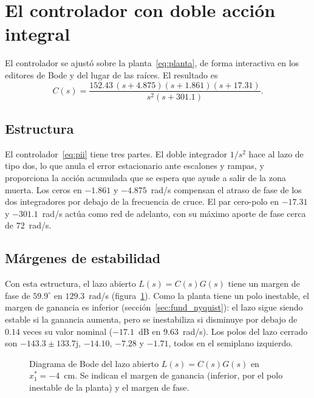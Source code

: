 \section{El controlador con doble acción integral}\label{sec:pii}

El controlador se ajustó sobre la planta~\eqref{eq:planta}, de forma interactiva en los editores de Bode y del lugar de las raíces. El resultado es
\begin{equation}
C(s)=\frac{152.43\,(s+4.875)(s+1.861)(s+17.31)}
{s^{2}(s+301.1)} .
\label{eq:pii}
\end{equation}

\subsection{Estructura}

El controlador~\eqref{eq:pii} tiene tres partes. El doble integrador $1/s^2$ hace al lazo de tipo dos, lo que anula el error estacionario ante escalones y rampas, y proporciona la acción acumulada que se espera que ayude a salir de la zona muerta. Los ceros en $-1.861$ y $-4.875$~rad/s compensan el atraso de fase de los dos integradores por debajo de la frecuencia de cruce. El par cero-polo en $-17.31$ y $-301.1$~rad/s actúa como red de adelanto, con su máximo aporte de fase cerca de $72$~rad/s.

\subsection{Márgenes de estabilidad}

Con esta estructura, el lazo abierto $L(s)=C(s)G(s)$ tiene un margen de fase de $59.9^\circ$ en $129.3$~rad/s (figura~\ref{bode_fase}). Como la planta tiene un polo inestable, el margen de ganancia es inferior (sección~\ref{sec:fund_nyquist}): el lazo sigue siendo estable si la ganancia aumenta, pero se inestabiliza si disminuye por debajo de $0.14$ veces su valor nominal ($-17.1$~dB en $9.63$~rad/s). Los polos del lazo cerrado son $-143.3\pm133.7\mathrm{j}$, $-14.10$, $-7.28$ y $-1.71$, todos en el semiplano izquierdo.

\begin{figure}[ht]
    \centering
    
    \caption[Diagrama de Bode]{Diagrama de Bode del lazo abierto $L(s)=C(s)G(s)$ en $x_1^*=-4$~cm. Se indican el margen de ganancia (inferior, por el polo inestable de la planta) y el margen de fase.}
    \label{bode_fase}
\end{figure}

